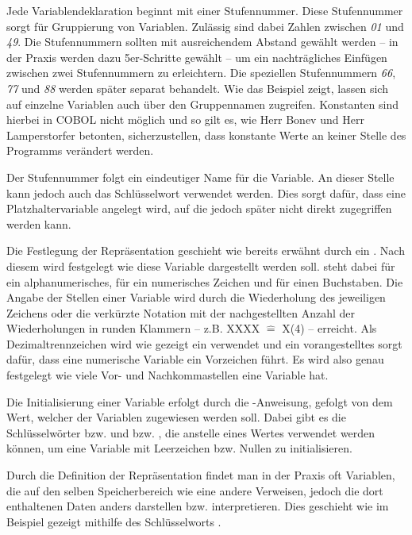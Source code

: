 Jede Variablendeklaration beginnt mit einer Stufennummer. Diese Stufennummer sorgt für Gruppierung von Variablen. Zulässig sind dabei Zahlen zwischen \textit{01} und \textit{49}. Die Stufennummern sollten mit ausreichendem Abstand gewählt werden -- in der Praxis werden dazu 5er-Schritte gewählt --  um ein nachträgliches Einfügen zwischen zwei Stufennummern zu erleichtern. Die speziellen Stufennummern \textit{66}, \textit{77} und \textit{88} werden später separat behandelt. Wie das Beispiel zeigt, lassen sich auf einzelne Variablen auch über den Gruppennamen zugreifen. Konstanten sind hierbei in COBOL nicht möglich und so gilt es, wie Herr Bonev und Herr Lamperstorfer betonten, sicherzustellen, dass konstante Werte an keiner Stelle des Programms verändert werden.

Der Stufennummer folgt ein eindeutiger Name für die Variable. An dieser Stelle kann jedoch auch das Schlüsselwort  verwendet werden. Dies sorgt dafür, dass eine Platzhaltervariable angelegt wird, auf die jedoch später nicht direkt zugegriffen werden kann.

Die Festlegung der Repräsentation geschieht wie bereits erwähnt durch ein . Nach diesem  wird festgelegt wie diese Variable dargestellt werden soll.  steht dabei für ein alphanumerisches,  für ein numerisches Zeichen und  für einen Buchstaben. Die Angabe der Stellen einer Variable wird durch die Wiederholung des jeweiligen Zeichens oder die verkürzte Notation mit der nachgestellten Anzahl der Wiederholungen in runden Klammern -- z.B. XXXX $\widehat{=}$ X(4) -- erreicht. Als Dezimaltrennzeichen wird wie gezeigt ein  verwendet und ein vorangestelltes  sorgt dafür, dass eine numerische Variable ein Vorzeichen führt. Es wird also genau festgelegt wie viele Vor- und Nachkommastellen eine Variable hat.

Die Initialisierung einer Variable erfolgt durch die -Anweisung, gefolgt von dem Wert, welcher der Variablen zugewiesen werden soll. Dabei gibt es die Schlüsselwörter  bzw.  und  bzw. , die anstelle eines Wertes verwendet werden können, um eine Variable mit Leerzeichen bzw. Nullen zu initialisieren.

Durch die Definition der Repräsentation findet man in der Praxis oft Variablen, die auf den selben Speicherbereich wie eine andere Verweisen, jedoch die dort enthaltenen Daten anders darstellen bzw. interpretieren. Dies geschieht wie im Beispiel gezeigt mithilfe des Schlüsselworts .

